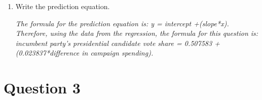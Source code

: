 \documentclass[12pt,letterpaper]{article}
\begin{document}
\begin{enumerate}
			\textbf{code}		
			\begin{verbatim}
				res2 <- resid(reg2)
				res2
			\end{verbatim}
			
			\textit{Residuals indicate the distance of the values of each observation from the predicted values, which fall on the line of best fit.}\vspace{.5cm}
		
		\item Write the prediction equation.
		
		\textit{The formula for the prediction equation is: y = intercept +(slope*x). Therefore, using the data from the regression, the formula for this question is: incumbent party's presidential candidate vote share = 0.507583 + (0.023837*difference in campaign spending).}\vspace{.5cm}
		
	\end{enumerate}
	
	\newpage	
\section*{Question 3}
\end{document}
